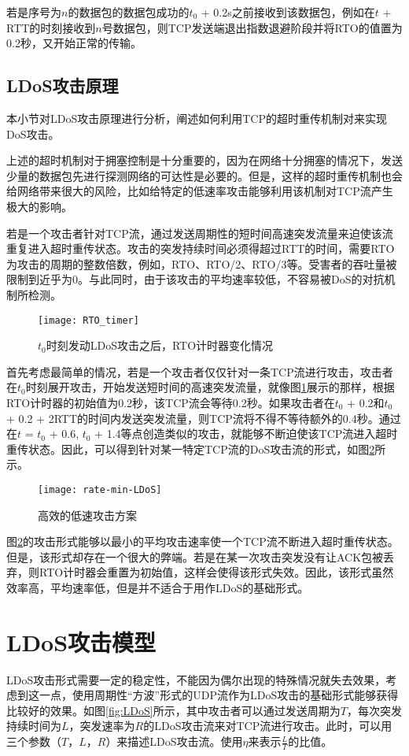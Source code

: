 若是序号为$n$的数据包的数据包成功的$t_0$ + 0.2s之前接收到该数据包，例如在$t$ + RTT的时刻接收到$n$号数据包，则TCP发送端退出指数退避阶段并将RTO的值置为0.2秒，又开始正常的传输。

\subsection{LDoS攻击原理}
本小节对LDoS攻击原理进行分析，阐述如何利用TCP的超时重传机制对来实现DoS攻击。

上述的超时机制对于拥塞控制是十分重要的，因为在网络十分拥塞的情况下，发送少量的数据包先进行探测网络的可达性是必要的。但是，这样的超时重传机制也会给网络带来很大的风险，比如给特定的低速率攻击能够利用该机制对TCP流产生极大的影响。

若是一个攻击者针对TCP流，通过发送周期性的短时间高速突发流量来迫使该流重复进入超时重传状态。攻击的突发持续时间必须得超过RTT的时间，需要RTO为攻击的周期的整数倍数，例如，RTO、RTO/2、RTO/3等。受害者的吞吐量被限制到近乎为0。与此同时，由于该攻击的平均速率较低，不容易被DoS的对抗机制所检测。

\begin{figure}
    \centering
    \texttt{[image: RTO\_timer]}
    \caption{$t_0$时刻发动LDoS攻击之后，RTO计时器变化情况}
    \label{fig:rto-timer}
\end{figure}

首先考虑最简单的情况，若是一个攻击者仅仅针对一条TCP流进行攻击，攻击者在$t_0$时刻展开攻击，开始发送短时间的高速突发流量，就像图\ref{fig:rto-timer}展示的那样，根据RTO计时器的初始值为0.2秒，该TCP流会等待0.2秒。如果攻击者在$t_0$ + 0.2和$t_0$ + 0.2 + 2RTT的时间内发送突发流量，则TCP流将不得不等待额外的0.4秒。通过在$t$ = $t_0$ + 0.6, $t_0$ + 1.4等点创造类似的攻击，就能够不断迫使该TCP流进入超时重传状态。因此，可以得到针对某一特定TCP流的DoS攻击流的形式，如图\ref{fig:rate-min-LDoS}所示。

\begin{figure}
    \centering
    \texttt{[image: rate-min-LDoS]}
    \caption{高效的低速攻击方案}
    \label{fig:rate-min-LDoS}
\end{figure}

图\ref{fig:rate-min-LDoS}的攻击形式能够以最小的平均攻击速率使一个TCP流不断进入超时重传状态。但是，该形式却存在一个很大的弊端。若是在某一次攻击突发没有让ACK包被丢弃，则RTO计时器会重置为初始值，这样会使得该形式失效。因此，该形式虽然效率高，平均速率低，但是并不适合于用作LDoS的基础形式。


\section{LDoS攻击模型}
\label{chap3:LDoS-model}
LDoS攻击形式需要一定的稳定性，不能因为偶尔出现的特殊情况就失去效果，考虑到这一点，使用周期性“方波”形式的UDP流作为LDoS攻击的基础形式能够获得比较好的效果。如图\ref{fig:LDoS}所示，其中攻击者可以通过发送周期为$T$，每次突发持续时间为$L$，突发速率为$R$的LDoS攻击流来对TCP流进行攻击。此时，可以用三个参数（$T$，$L$，$R$）来描述LDoS攻击流。使用$\eta$来表示$\frac{L}{T}$的比值。

